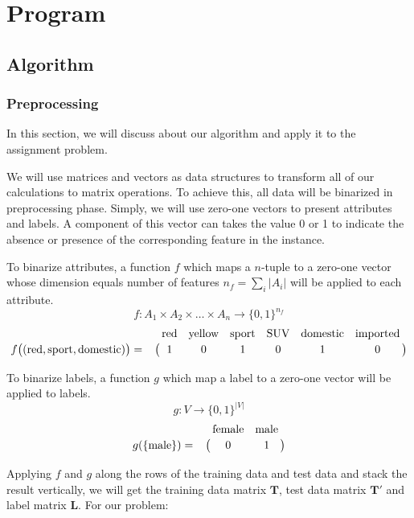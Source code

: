 \documentclass[a4paper]{article}
\newcommand{\matr}[1]{\mathbf{#1}}
\begin{document}
\section{Program}

	\subsection{Algorithm}

		\subsubsection{Preprocessing}

			In this section, we will discuss about our algorithm and apply it to the
			assignment problem.

			We will use matrices and vectors as data structures to
			transform all of our calculations to matrix operations. To achieve this,
			all data will be binarized in preprocessing phase. Simply, we will use
			zero-one vectors to present attributes and labels. A component of this vector 
			can takes the value 0 or 1 to indicate the absence or presence of the
			corresponding feature in the instance.
			
			To binarize attributes, a function $f$ which maps a $n$-tuple to a
			zero-one vector whose dimension equals number of features
			$n_f=\sum_i{|A_i|}$ will be applied to each attribute.
			\[ f: A_1 \times A_2 \times \ldots \times A_n \to \{0, 1\}^{n_f}\]
			\[f\big((\text{red}, \text{sport}, \text{domestic})\big) =
				\bordermatrix{~&\text{red}&\text{yellow}&\text{sport}&\text{SUV}&\text{domestic}&\text{imported} \cr
					~ & 1 & 0 & 1 & 0 & 1 & 0 \cr}
			\]
			
			To binarize labels, a function $g$ which map a label to a zero-one vector
			will be applied to labels.
			\[ g: V \to \{0, 1\}^{\left| V \right|} \]
			\[ g(\{\text{male}\}) = \bordermatrix{~&\text{female}&\text{male} \cr
				~ & 0 & 1 \cr}\]
			
			Applying $f$ and $g$ along the rows of the training data and test data and
			stack the result vertically, we will get the training data matrix
			$\matr{T}$, test data matrix $\matr{T'}$ and label matrix $\matr{L}$.
			For our problem:
			
\end{document}
